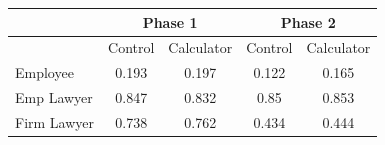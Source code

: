 \begin{tabular}{lcccc}
\toprule
      & \multicolumn{2}{c}{Phase 1} & \multicolumn{2}{c}{Phase 2} \\
\midrule
\midrule
      & Control & Calculator & Control & Calculator \\
\midrule
\midrule
\multicolumn{1}{p{4.055em}}{Employee } & 0.193 & 0.197 & 0.122 & 0.165 \\
Emp Lawyer & 0.847 & 0.832 & 0.85  & 0.853 \\
Firm Lawyer & 0.738 & 0.762 & 0.434 & 0.444 \\
\bottomrule
\bottomrule
\end{tabular}%
